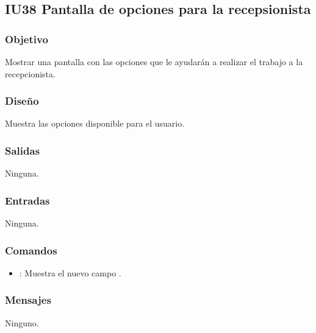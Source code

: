 
\subsection{IU38 Pantalla de opciones para la recepsionista}

\subsubsection{Objetivo}
	Mostrar una pantalla con las opciones que le ayudarán a realizar el trabajo a la recepcionista.

\subsubsection{Diseño}
	Muestra las opciones disponible para el usuario.


\subsubsection{Salidas}

	Ninguna.

\subsubsection{Entradas}
	Ninguna.

\subsubsection{Comandos}
\begin{itemize}
	\item {}: Muestra el nuevo campo .
\end{itemize}

\subsubsection{Mensajes}
	\begin{Citemize}
		\item Ninguno.
	\end{Citemize}
	

